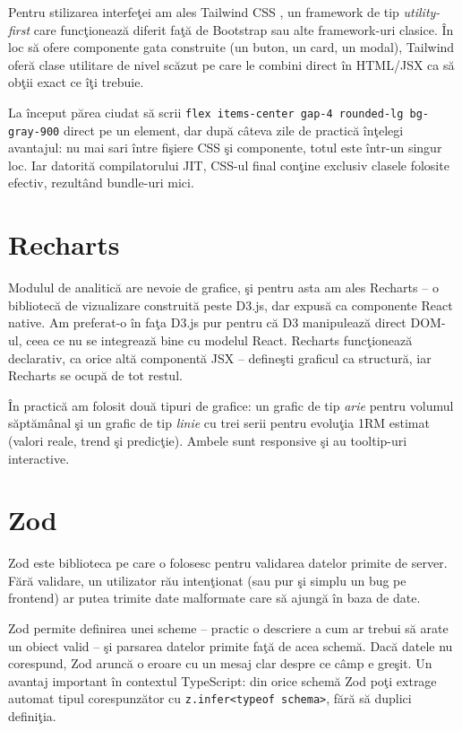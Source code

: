 Pentru stilizarea interfe\c tei am ales Tailwind CSS
\cite{tailwind2024}, un framework de tip
\textit{utility-first} care func\c tioneaz\u a diferit
fa\c t\u a de Bootstrap sau alte framework-uri clasice.
\^ In loc s\u a ofere componente gata construite (un buton,
un card, un modal), Tailwind ofer\u a clase utilitare
de nivel sc\u azut pe care le combini direct \^ in
HTML/JSX ca s\u a ob\c tii exact ce \^ i\c ti trebuie.

La \^ inceput p\u area ciudat s\u a scrii
\texttt{flex items-center gap-4 rounded-lg bg-gray-900}
direct pe un element, dar dup\u a c\^ ateva zile de
practic\u a \^ in\c telegi avantajul: nu mai sari \^ intre
fi\c siere CSS \c si componente, totul este \^ intr-un
singur loc. Iar datorit\u a compilatorului JIT, CSS-ul
final con\c tine exclusiv clasele folosite efectiv,
rezult\^ and bundle-uri mici.

\section{Recharts}

Modulul de analitic\u a are nevoie de grafice, \c si pentru
asta am ales Recharts \cite{recharts2024} -- o bibliotec\u a
de vizualizare construit\u a peste D3.js, dar expus\u a ca
componente React native. Am preferat-o \^ in fa\c ta D3.js
pur pentru c\u a D3 manipuleaz\u a direct DOM-ul, ceea ce
nu se integreaz\u a bine cu modelul React. Recharts
func\c tioneaz\u a declarativ, ca orice alt\u a component\u a
JSX -- define\c sti graficul ca structur\u a, iar Recharts
se ocup\u a de tot restul.

\^ In practic\u a am folosit dou\u a tipuri de grafice:
un grafic de tip \textit{arie} pentru volumul s\u apt\u am\^ anal
\c si un grafic de tip \textit{linie} cu trei serii pentru
evolu\c tia 1RM estimat (valori reale, trend \c si
predic\c tie). Ambele sunt responsive \c si au tooltip-uri
interactive.

\section{Zod}

Zod \cite{zod2024} este biblioteca pe care o folosesc
pentru validarea datelor primite de server. F\u ar\u a
validare, un utilizator r\u au inten\c tionat (sau pur
\c si simplu un bug pe frontend) ar putea trimite date
malformate care s\u a ajung\u a \^ in baza de date.

Zod permite definirea unei scheme -- practic o descriere
a cum ar trebui s\u a arate un obiect valid -- \c si
parsarea datelor primite fa\c t\u a de acea schem\u a.
Dac\u a datele nu corespund, Zod arunc\u a o eroare cu
un mesaj clar despre ce c\^ amp e gre\c sit. Un avantaj
important \^ in contextul TypeScript: din orice schem\u a
Zod po\c ti extrage automat tipul corespunz\u ator cu
\texttt{z.infer<typeof schema>}, f\u ar\u a s\u a
duplici defini\c tia.


